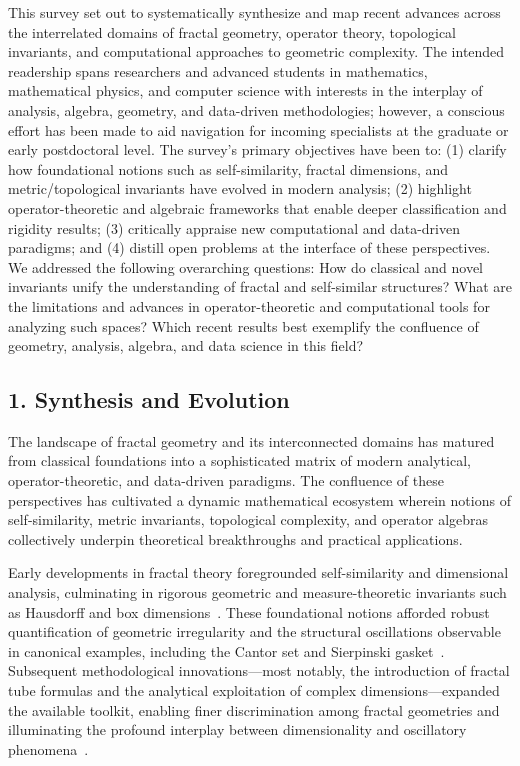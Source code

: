 \documentclass[sigconf]{acmart}
\begin{document}
This survey set out to systematically synthesize and map recent advances across the interrelated domains of fractal geometry, operator theory, topological invariants, and computational approaches to geometric complexity. The intended readership spans researchers and advanced students in mathematics, mathematical physics, and computer science with interests in the interplay of analysis, algebra, geometry, and data-driven methodologies; however, a conscious effort has been made to aid navigation for incoming specialists at the graduate or early postdoctoral level. The survey's primary objectives have been to: (1) clarify how foundational notions such as self-similarity, fractal dimensions, and metric/topological invariants have evolved in modern analysis; (2) highlight operator-theoretic and algebraic frameworks that enable deeper classification and rigidity results; (3) critically appraise new computational and data-driven paradigms; and (4) distill open problems at the interface of these perspectives. We addressed the following overarching questions: How do classical and novel invariants unify the understanding of fractal and self-similar structures? What are the limitations and advances in operator-theoretic and computational tools for analyzing such spaces? Which recent results best exemplify the confluence of geometry, analysis, algebra, and data science in this field?

\subsection*{1. Synthesis and Evolution} 

The landscape of fractal geometry and its interconnected domains has matured from classical foundations into a sophisticated matrix of modern analytical, operator-theoretic, and data-driven paradigms. The confluence of these perspectives has cultivated a dynamic mathematical ecosystem wherein notions of self-similarity, metric invariants, topological complexity, and operator algebras collectively underpin theoretical breakthroughs and practical applications.

Early developments in fractal theory foregrounded self-similarity and dimensional analysis, culminating in rigorous geometric and measure-theoretic invariants such as Hausdorff and box dimensions~\cite{ref2,ref36}. These foundational notions afforded robust quantification of geometric irregularity and the structural oscillations observable in canonical examples, including the Cantor set and Sierpinski gasket~\cite{ref3}. Subsequent methodological innovations---most notably, the introduction of fractal tube formulas and the analytical exploitation of complex dimensions---expanded the available toolkit, enabling finer discrimination among fractal geometries and illuminating the profound interplay between dimensionality and oscillatory phenomena~\cite{ref3,ref36}.
\end{document}
